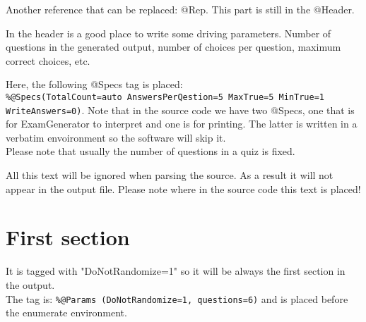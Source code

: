 \documentclass[a4paper,10pt]{article}%
\begin{document}
\large
Another reference that can be replaced: @Rep. This part is still in the @Header.
\normalsize

In the header is a good place to write some driving parameters. Number of questions in the generated output, number of choices per question, maximum correct choices, etc.

Here, the following @Specs tag is placed:\\ \verb+%@Specs(TotalCount=auto AnswersPerQestion=5 MaxTrue=5 MinTrue=1 WriteAnswers=0)+. Note that in the source code we have two @Specs, one that is for ExamGenerator to interpret and one is for printing. The latter is written in a verbatim envoironment so the software will skip it. \\


Please note that usually the number of questions in a quiz is fixed.

 \setlength{\itemsep}{1pt}
 \setlength{\parskip}{0pt}
 \setlength{\parsep}{0pt}


All this text will be ignored when parsing the source. As a result it will not appear in the output file. Please note where in the source code this text is placed!


\section{First section}
It is tagged with "DoNotRandomize=1" so it will be always the first section in the output. \\The tag is: \verb+%@Params (DoNotRandomize=1, questions=6)+ and is placed before the enumerate environment.
\end{document}
